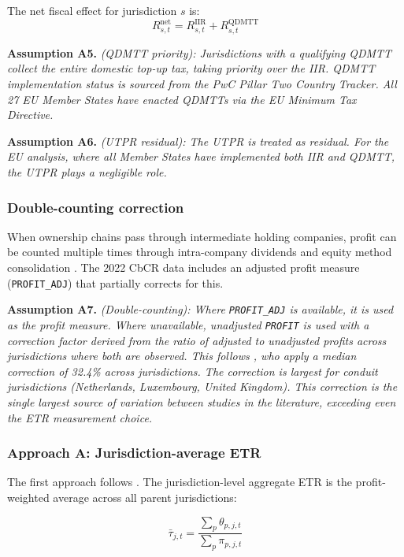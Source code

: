 \documentclass[11pt,a4paper]{article}
\newcommand{\code}[1]{\texttt{#1}}
\newcommand{\assumption}[2]{\noindent\textbf{Assumption #1.} \textit{#2}\medskip}
\begin{document}
The net fiscal effect for jurisdiction $s$ is:
\begin{equation}\label{eq:net}
R_{s,t}^{\text{net}} = R_{s,t}^{\text{IIR}} + R_{s,t}^{\text{QDMTT}}
\end{equation}

\assumption{A5}{(QDMTT priority): Jurisdictions with a qualifying QDMTT collect the entire domestic top-up tax, taking priority over the IIR. QDMTT implementation status is sourced from the PwC Pillar Two Country Tracker. All 27 EU Member States have enacted QDMTTs via the EU Minimum Tax Directive.}

\assumption{A6}{(UTPR residual): The UTPR is treated as residual. For the EU analysis, where all Member States have implemented both IIR and QDMTT, the UTPR plays a negligible role.}

\subsubsection{Double-counting correction}\label{sec:doublecounting}

When ownership chains pass through intermediate holding companies, profit can be counted multiple times through intra-company dividends and equity method consolidation \citep{blouin2023}. The 2022 CbCR data includes an adjusted profit measure (\code{PROFIT\_ADJ}) that partially corrects for this.

\assumption{A7}{(Double-counting): Where \code{PROFIT\_ADJ} is available, it is used as the profit measure. Where unavailable, unadjusted \code{PROFIT} is used with a correction factor derived from the ratio of adjusted to unadjusted profits across jurisdictions where both are observed. This follows \citet{hugger2026}, who apply a median correction of 32.4\% across jurisdictions. The correction is largest for conduit jurisdictions (Netherlands, Luxembourg, United Kingdom). This correction is the single largest source of variation between studies in the literature, exceeding even the ETR measurement choice.}

\subsubsection{Approach A: Jurisdiction-average ETR}\label{sec:approach_a}

The first approach follows \citet{barake2022}. The jurisdiction-level aggregate ETR is the profit-weighted average across all parent jurisdictions:

\begin{equation}\label{eq:etr_agg}
\bar{\tau}_{j,t} = \frac{\sum_p \theta_{p,j,t}}{\sum_p \pi_{p,j,t}}
\end{equation}
\end{document}
